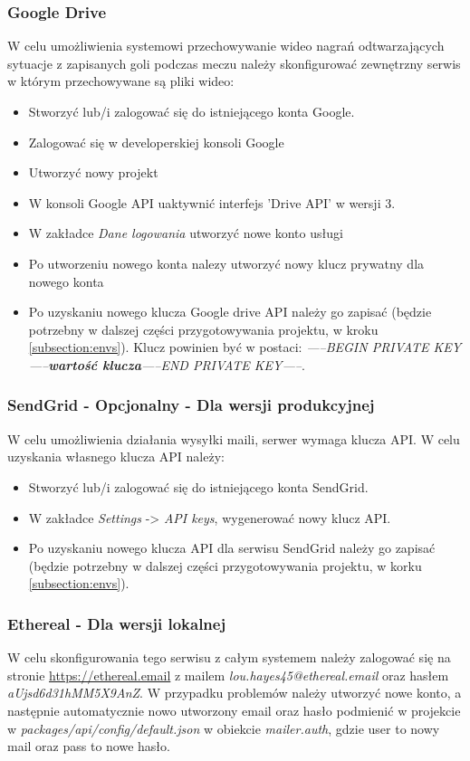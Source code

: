 \subsubsection{Google Drive}
W celu umożliwienia systemowi przechowywanie wideo nagrań odtwarzających sytuacje z zapisanych goli podczas meczu należy skonfigurować zewnętrzny serwis w którym przechowywane są pliki wideo:

\begin{itemize}
	\item Stworzyć lub/i zalogować się do istniejącego konta Google.
	\item Zalogować się w developerskiej konsoli Google
	\item Utworzyć nowy projekt
	\item W konsoli Google API uaktywnić interfejs 'Drive API' w wersji 3.
	\item W zakładce \textit{Dane logowania} utworzyć nowe konto usługi
	\item Po utworzeniu nowego konta nalezy utworzyć nowy klucz prywatny dla nowego konta
  \item Po uzyskaniu nowego klucza Google drive API należy go zapisać  (będzie potrzebny w dalszej części przygotowywania projektu, w kroku \ref{subsection:envs}). Klucz powinien być w postaci: \newline \textit{-----BEGIN PRIVATE KEY-----\textbf{wartość klucza}-----END PRIVATE KEY-----}.
\end{itemize}


\subsubsection{SendGrid - Opcjonalny - Dla wersji produkcyjnej}
W celu umożliwienia działania wysyłki maili, serwer wymaga klucza API. W celu uzyskania własnego klucza API należy:

\begin{itemize}
	\item Stworzyć lub/i zalogować się do istniejącego konta SendGrid.
	\item W zakładce \textit{Settings} -> \textit{API keys}, wygenerować nowy klucz API.
	\item Po uzyskaniu nowego klucza API dla serwisu SendGrid należy go zapisać (będzie potrzebny w dalszej części przygotowywania projektu, w korku \ref{subsection:envs}).
\end{itemize}

\label{application:preparation:etheral}
\subsubsection{Ethereal - Dla wersji lokalnej}
W celu skonfigurowania tego serwisu z całym systemem należy zalogować się na stronie \url{https://ethereal.email} z mailem
\textit{lou.hayes45@ethereal.email} oraz hasłem \textit{aUjsd6d31hMM5X9AnZ}. W przypadku problemów należy utworzyć nowe konto, a następnie automatycznie nowo utworzony email oraz hasło podmienić w projekcie w \textit{packages/api/config/default.json} w obiekcie \textit{mailer.auth}, gdzie user to nowy mail oraz pass to nowe hasło.

